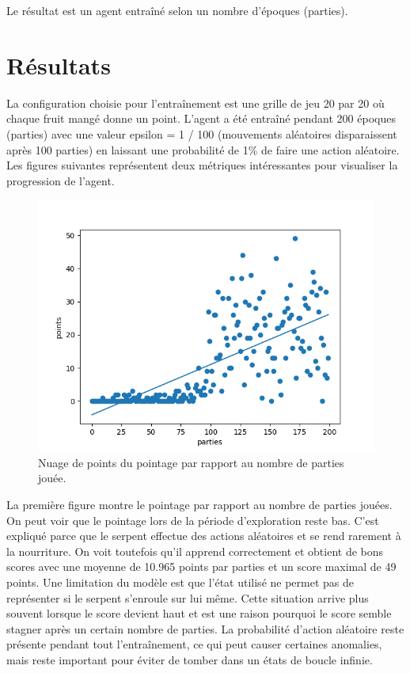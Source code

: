 \documentclass{article}
\begin{document}
Le résultat est un agent entraîné selon un nombre d'époques (parties).

\section{Résultats}

La configuration choisie pour l'entraînement est une grille de jeu 20 par 20 où chaque fruit mangé donne un point. L’agent a été entraîné pendant 200 époques (parties) avec une valeur epsilon = 1 / 100 (mouvements aléatoires disparaissent après 100 parties) en laissant une probabilité de 1\% de faire une action aléatoire. Les figures suivantes représentent deux métriques intéressantes pour visualiser la progression de l'agent.

\begin{figure}[ht]
	\includegraphics[width=\linewidth]{scatter_score_200_games.png}
	\caption{Nuage de points du pointage par rapport au nombre de parties jouée.}
	\label{fig:Snake}
\end{figure}

La première figure montre le pointage par rapport au nombre de parties jouées. On peut voir que le pointage lors de la période d’exploration reste bas. C’est expliqué parce que le serpent effectue des actions aléatoires et se rend rarement à la nourriture. On voit toutefois qu’il apprend correctement et obtient de bons scores avec une moyenne de 10.965 points par parties et un score maximal de 49 points. Une limitation du modèle est que l’état utilisé ne permet pas de représenter si le serpent s’enroule sur lui même. Cette situation arrive plus souvent lorsque le score devient haut et est une raison pourquoi le score semble stagner après un certain nombre de parties. La probabilité d’action aléatoire reste présente pendant tout l'entraînement, ce qui peut causer certaines anomalies, mais reste important pour éviter de tomber dans un états de boucle infinie.
\end{document}
